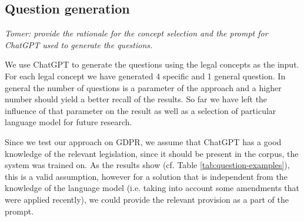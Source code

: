\documentclass{IOS-Book-Article}
\begin{document}
\subsection{Question generation}

\textit{Tomer: provide the rationale for the concept selection and the prompt for ChatGPT used to generate the questions.}

We use ChatGPT to generate the questions using the legal concepts as the input. For each legal concept we have generated
4 specific and 1 general question. In general the number of questions is a parameter of the approach and a higher number
should yield a better recall of the results. So far we have left the influence of that parameter on the result as well
as a selection of particular language model for future research.

Since we test our approach on GDPR, we assume that ChatGPT has a good knowledge
of the relevant legislation, since it should be present in the corpus, the
system was trained on. As the results show (cf. Table
\ref{tab:question-examples}), this is a valid assumption, however for a solution
that is independent from the knowledge of the language model (i.e. taking into
account some amendments that were applied recently), we could provide the
relevant provision as a part of the prompt.
\end{document}
